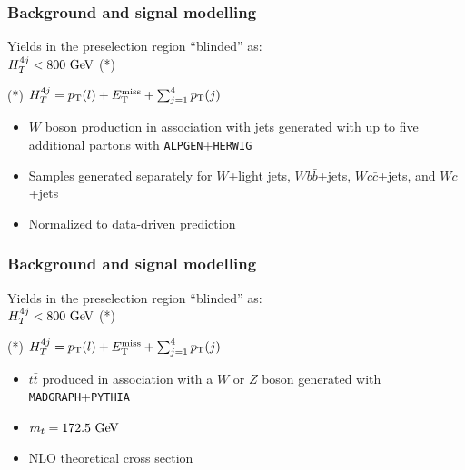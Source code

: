 \begin{frame}\frametitle{Background and signal modelling}
\centering\myskip

\begin{minipage}{.5\textwidth}\footnotesize\centering
\scriptsize
Yields in the preselection region ``blinded'' as:\\
$\htfj<800\gev$ (*)
\myskip

  

\myskip
(*) $\htfj = \pT(l) + \met + \sum_{j = 1}^{\rm 4}\pT(j)$
\end{minipage}\begin{minipage}{.5\textwidth}\footnotesize\centering


\begin{itemize}
\item $W$ boson production in association with jets generated with up to five additional partons with {\tt ALPGEN}+{\tt HERWIG}
\item Samples generated separately for $W$+light jets, $Wb\bar{b}$+jets, $Wc\bar{c}$+jets, and $Wc$+jets
\item Normalized to data-driven prediction
\end{itemize}

\end{minipage}
\end{frame}


\begin{frame}\frametitle{Background and signal modelling}
\centering\myskip

\begin{minipage}{.5\textwidth}\footnotesize\centering
\scriptsize
Yields in the preselection region ``blinded'' as:\\
$\htfj<800\gev$ (*)
\myskip

  

\myskip
(*) $\htfj = \pT(l) + \met + \sum_{j = 1}^{\rm 4}\pT(j)$
\end{minipage}\begin{minipage}{.5\textwidth}\footnotesize\centering

\begin{itemize}
\item $t\bar{t}$ produced in association with a $W$ or $Z$ boson generated with {\tt MADGRAPH}+{\tt PYTHIA}
\item $m_t = 172.5\gev$
\item NLO theoretical cross section
\end{itemize}

\end{minipage}
\end{frame}


